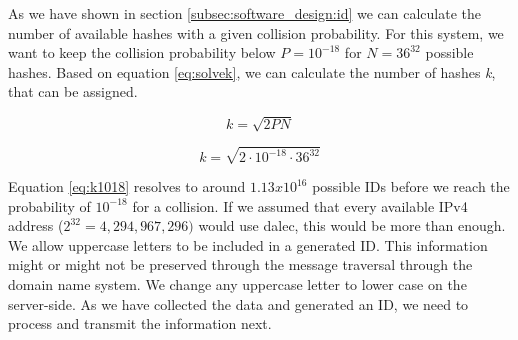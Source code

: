      As we have shown in section \ref{subsec:software_design:id} we can calculate the number of available hashes with a given collision probability. For this system, we want to keep the collision probability below $P = 10^{-18}$ for $N = 36^{32}$ possible hashes.
     Based on equation \ref{eq:solvek}, we can calculate the number of hashes \textit{k}, that can be assigned.
     
     \begin{equation*}
         k = \sqrt{2PN}
     \end{equation*}
     
     \begin{equation}
        \label{eq:k1018}
         k = \sqrt{2 \cdot  10^{-18} \cdot 36^{32}}
     \end{equation}
     
     Equation \ref{eq:k1018} resolves to around $1.13x10^{16}$ possible IDs before we reach the probability of $10^{-18}$ for a collision. If we assumed that every available IPv4 address ($2^{32} = 4,294,967,296)$ would use dalec, this would be more than enough.\\
     
     We allow uppercase letters to be included in a generated ID. This information might or might not be preserved through the message traversal through the domain name system. We change any uppercase letter to lower case on the server-side. 
     As we have collected the data and generated an ID, we need to process and transmit the information next.
     
     
% 
